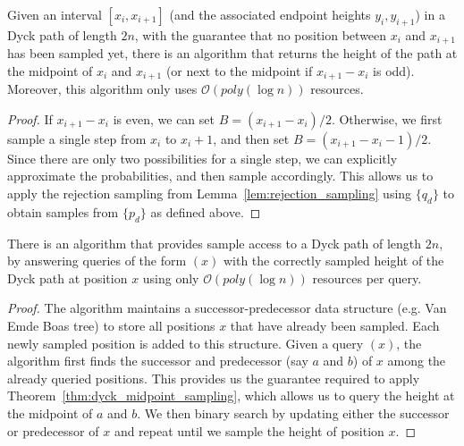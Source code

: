 \begin{theorem}
\label{thm:dyck_midpoint_sampling}
Given an interval $[x_i,x_{i+1}]$ (and the associated endpoint heights $y_i, y_{i+1}$) in a Dyck path of length $2n$,
with the guarantee that no position between $x_i$ and $x_{i+1}$ has been sampled yet,
there is an algorithm that returns the height of the path at the midpoint of $x_i$ and $x_{i+1}$ (or next to the midpoint if $x_{i+1}-x_i$ is odd).
Moreover, this algorithm only uses $\mathcal O(poly(\log n))$ resources.
\end{theorem}
\begin{proof}
If $x_{i+1}-x_i$ is even, we can set $B = (x_{i+1}-x_i)/2$.
Otherwise, we first sample a single step from $x_i$ to $x_i+1$, and then set $B = (x_{i+1}-x_i-1)/2$.
Since there are only two possibilities for a single step, we can explicitly approximate the probabilities, and then sample accordingly.
This allows us to apply the rejection sampling from Lemma~\ref{lem:rejection_sampling}
using $\{ q_d\}$ to obtain samples from $\{ p_d\}$ as defined above.
\end{proof}

\begin{theorem}
\label{thm:dyck_height_sampling}
There is an algorithm that provides sample access to a Dyck path of length $2n$,
by answering queries of the form $(x)$ with the correctly sampled height of the Dyck path at position $x$
using only $\mathcal O(poly(\log n))$ resources per query.
\end{theorem}
\begin{proof}
The algorithm maintains a successor-predecessor data structure (e.g. Van Emde Boas tree) to store all positions $x$ that have already been sampled.
Each newly sampled position is added to this structure.
Given a query $(x)$, the algorithm first finds the successor and predecessor (say $a$ and $b$) of $x$ among the already queried positions.
This provides us the guarantee required to apply Theorem~\ref{thm:dyck_midpoint_sampling},
which allows us to query the height at the midpoint of $a$ and $b$.
We then binary search by updating either the successor or predecessor of $x$ and repeat until we sample the height of position $x$.
\end{proof}




